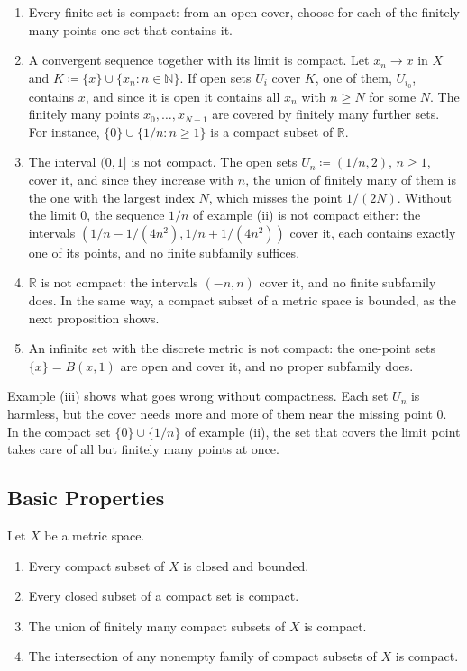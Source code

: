 \begin{enumerate}
\item Every finite set is compact: from an open cover, choose for each of the finitely many points one set that contains it.
\item A convergent sequence together with its limit is compact. Let $x_n\to x$ in $X$ and $K\coloneqq\{x\}\cup\{x_n: n\in\mathbb N\}$. If open sets $U_i$ cover $K$, one of them, $U_{i_0}$, contains $x$, and since it is open it contains all $x_n$ with $n\ge N$ for some $N$. The finitely many points $x_0,\ldots,x_{N-1}$ are covered by finitely many further sets. For instance, $\{0\}\cup\{1/n: n\ge1\}$ is a compact subset of $\mathbb R$.
\item The interval $(0,1]$ is not compact. The open sets $U_n\coloneqq(1/n,2)$, $n\ge1$, cover it, and since they increase with $n$, the union of finitely many of them is the one with the largest index $N$, which misses the point $1/(2N)$. Without the limit $0$, the sequence $1/n$ of example (ii) is not compact either: the intervals $(1/n-1/(4n^2),1/n+1/(4n^2))$ cover it, each contains exactly one of its points, and no finite subfamily suffices.
\item $\mathbb R$ is not compact: the intervals $(-n,n)$ cover it, and no finite subfamily does. In the same way, a compact subset of a metric space is bounded, as the next proposition shows.
\item An infinite set with the discrete metric is not compact: the one-point sets $\{x\}=B(x,1)$ are open and cover it, and no proper subfamily does.
\end{enumerate}

Example (iii) shows what goes wrong without compactness. Each set $U_n$ is harmless, but the cover needs more and more of them near the missing point $0$. In the compact set $\{0\}\cup\{1/n\}$ of example (ii), the set that covers the limit point takes care of all but finitely many points at once.

\subsection{Basic Properties}

\begin{proposition}
\label{prop:compact-basic}
Let $X$ be a metric space.
\begin{enumerate}
\item Every compact subset of $X$ is closed and bounded.
\item Every closed subset of a compact set is compact.
\item The union of finitely many compact subsets of $X$ is compact.
\item The intersection of any nonempty family of compact subsets of $X$ is compact.
\end{enumerate}
\end{proposition}

